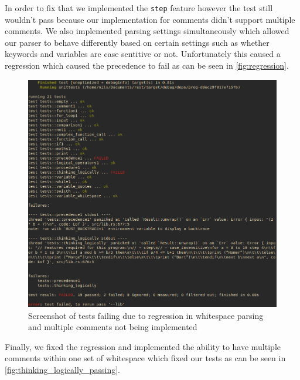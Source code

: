 \documentclass{article}
\begin{document}
In order to fix that we implemented the \texttt{step} feature however the test
still wouldn't pass because our implementation for comments didn't support
multiple comments. We also implemented parsing settings simultaneously which
allowed our parser to behave differently based on certain settings such as
whether keywords and variables are case sentitive or not. Unfortunately this
caused a regression which caused the precedence to fail as can be seen in
\autoref{fig:regression}.

\begin{figure}
	\includegraphics[width=\textwidth]{regression}
	\caption{Screenshot of tests failing due to regression in whitespace
	parsing and multiple comments not being implemented}
	\label{fig:regression}
\end{figure}

Finally, we fixed the regression and implemented the ability to have multiple
comments within one set of whitespace which fixed our tests as can be seen in
\autoref{fig:thinking_logically_passing}.
\end{document}
